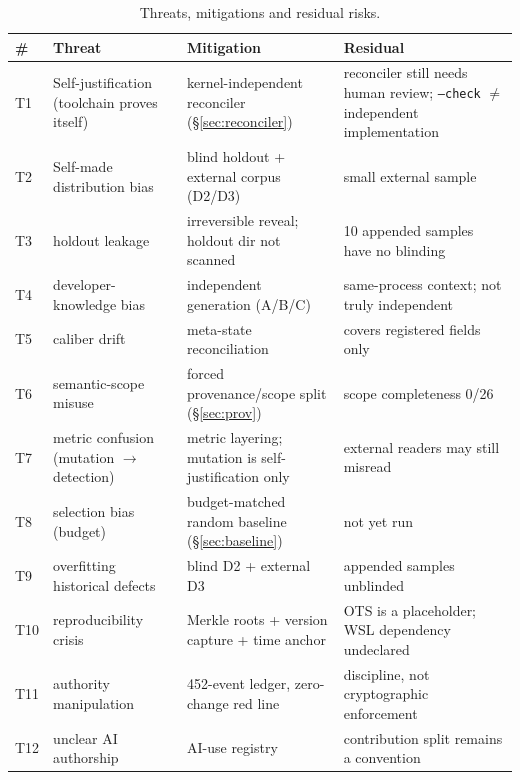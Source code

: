 \documentclass{article}
\begin{document}
\begin{table}[t]
\caption{Threats, mitigations and residual risks.}
\label{tab:threats}
\centering
\small
\begin{tabular}{@{}p{0.5cm}p{4.6cm}p{4.2cm}p{4.6cm}@{}}
\toprule
\# & Threat & Mitigation & Residual \\
\midrule
T1 & Self-justification (toolchain proves itself) & kernel-independent reconciler (\S\ref{sec:reconciler}) & reconciler still needs human review; \texttt{--check} $\neq$ independent implementation \\
T2 & Self-made distribution bias & blind holdout + external corpus (D2/D3) & small external sample \\
T3 & holdout leakage & irreversible reveal; holdout dir not scanned & 10 appended samples have no blinding \\
T4 & developer-knowledge bias & independent generation (A/B/C) & same-process context; not truly independent \\
T5 & caliber drift & meta-state reconciliation & covers registered fields only \\
T6 & semantic-scope misuse & forced provenance/scope split (\S\ref{sec:prov}) & scope completeness 0/26 \\
T7 & metric confusion (mutation $\to$ detection) & metric layering; mutation is self-justification only & external readers may still misread \\
T8 & selection bias (budget) & budget-matched random baseline (\S\ref{sec:baseline}) & not yet run \\
T9 & overfitting historical defects & blind D2 + external D3 & appended samples unblinded \\
T10 & reproducibility crisis & Merkle roots + version capture + time anchor & OTS is a placeholder; WSL dependency undeclared \\
T11 & authority manipulation & 452-event ledger, zero-change red line & discipline, not cryptographic enforcement \\
T12 & unclear AI authorship & AI-use registry & contribution split remains a convention \\
\bottomrule
\end{tabular}
\end{table}
\end{document}
